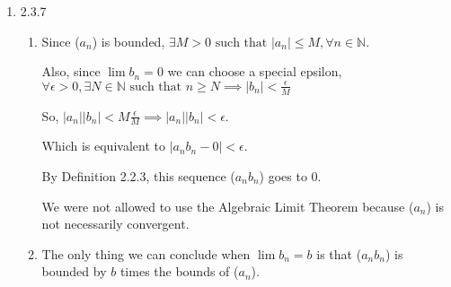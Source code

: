\documentclass[12pt,letterpaper]{article}
\begin{document}
\begin{enumerate}
    \item 2.3.7
      \begin{enumerate}
        \item
          Since ($a_n$) is bounded,
          $\exists M > 0 \text{ such that } |a_n| \le M, \forall n \in \mathbb{N}$.

          Also, since $\lim b_n = 0$ we can choose a special epsilon,
          $
            \forall \epsilon > 0, \exists N \in \mathbb{N} \text{ such that }
            n \ge N \implies |b_n| < \frac{\epsilon}{M}
          $

          So, $|a_n||b_n| < M\frac{\epsilon}{M} \implies |a_n||b_n| < \epsilon$.

          Which is equivalent to $|a_n b_n - 0| < \epsilon$.

          By Definition 2.2.3, this sequence ($a_n b_n$) goes to $0$.

          We were not allowed to use the Algebraic Limit Theorem
          because ($a_n$) is not necessarily convergent.

        \item
          The only thing we can conclude when $\lim b_n = b$
          is that ($a_n b_n$) is bounded by $b$ times the bounds of ($a_n$).
      \end{enumerate}
  \end{enumerate}
\end{document}
